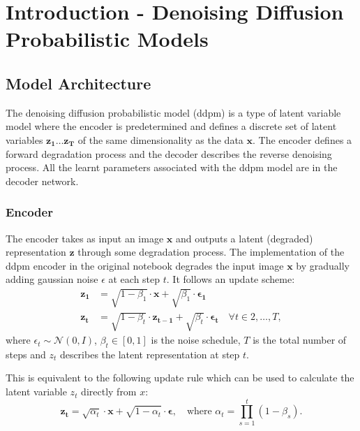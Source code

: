 \documentclass[11pt]{article}
\begin{document}
\section{Introduction - Denoising Diffusion Probabilistic Models}
\subsection{Model Architecture}
The denoising diffusion probabilistic model (ddpm) is a type of latent variable model where the encoder is predetermined and defines a discrete set of latent variables $\mathbf{z_1} \ldots \mathbf{z_T}$ of the same dimensionality as the data $\mathbf{x}$. The encoder defines a forward degradation process and the decoder describes the reverse denoising process. All the learnt parameters associated with the ddpm model are in the decoder network.

\subsubsection{Encoder}
The encoder takes as input an image $\mathbf{x}$ and outputs a latent (degraded) representation $\mathbf{z}$ through some degradation process. The implementation of the ddpm encoder in the original notebook degrades the input image $\mathbf{x}$ by gradually adding gaussian noise $\epsilon$ at each step $t$. It follows an update scheme:
\begin{equation}
    \begin{aligned}
        \mathbf{z_1} &= \sqrt{1-\beta_1} \cdot \mathbf{x} + \sqrt{\beta_1} \cdot \boldsymbol{\epsilon_1} \\
        \mathbf{z_t} &= \sqrt{1-\beta_t} \cdot \mathbf{z_{t-1}} + \sqrt{\beta_t} \cdot \boldsymbol{\epsilon_t} \quad \forall t \in 2, \ldots, T,
    \end{aligned}
    \end{equation}
    where $\epsilon_t \sim \mathcal{N}(0, I)$, $\beta_t \in [0,1]$ is the noise schedule, $T$ is the total number of steps and $z_t$ describes the latent representation at step $t$.

This is equivalent to the following update rule which can be used to calculate the latent variable $z_t$ directly from $x$:
\begin{equation}
    \mathbf{z_t} = \sqrt{\alpha_t} \cdot \mathbf{x} + \sqrt{1 - \alpha_t} \cdot \boldsymbol{\epsilon}, \quad \text{where } \alpha_t = \prod_{s=1}^{t} (1 - \beta_s).
    \label{eq:z_t_alpha}
\end{equation}
\end{document}
